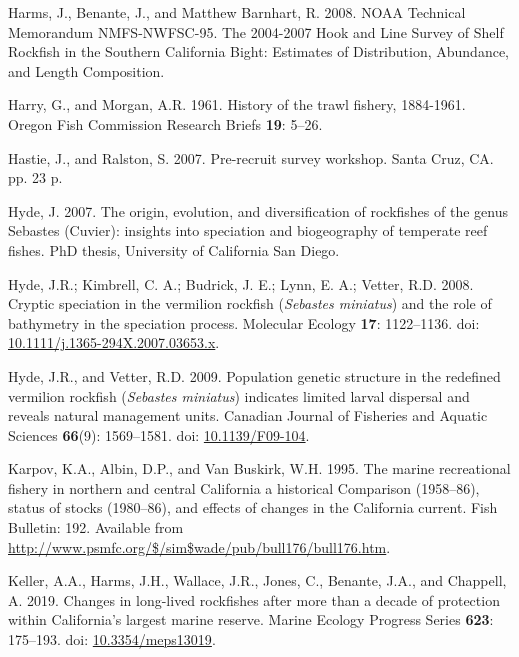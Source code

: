 \documentclass[11pt,
  english,
  a4paper,
]{article}
\newlength{\cslhangindent}
\newenvironment{CSLReferences}[2] %
 {%
  \setlength{\parindent}{0pt}
  \ifodd #1 \everypar{\setlength{\hangindent}{\cslhangindent}}\ignorespaces\fi
  \ifnum #2 > 0
  \setlength{\parskip}{#2\baselineskip}
  \fi
 }%
 {}
\begin{document}
\begin{CSLReferences}{1}{0}
\leavevmode{}%
Harms, J., Benante, J., and Matthew Barnhart, R. 2008. {NOAA Technical Memorandum NMFS-NWFSC-95. The 2004-2007 Hook and Line Survey of Shelf Rockfish in the Southern California Bight: Estimates of Distribution, Abundance, and Length Composition}.

\leavevmode{}%
Harry, G., and Morgan, A.R. 1961. {History of the trawl fishery, 1884-1961}. Oregon Fish Commission Research Briefs \textbf{19}: 5--26.

\leavevmode{}%
Hastie, J., and Ralston, S. 2007. {Pre-recruit survey workshop}. Santa Cruz, CA. pp. 23 p.

\leavevmode{}%
Hyde, J. 2007. {The origin, evolution, and diversification of rockfishes of the genus Sebastes (Cuvier): insights into speciation and biogeography of temperate reef fishes}. PhD thesis, University of California San Diego.

\leavevmode{}%
Hyde, J.R.; Kimbrell, C. A.; Budrick, J. E.; Lynn, E. A.; Vetter, R.D. 2008. {Cryptic speciation in the vermilion rockfish (\emph{Sebastes miniatus}) and the role of bathymetry in the speciation process}. Molecular Ecology \textbf{17}: 1122--1136. doi: \href{https://doi.org/10.1111/j.1365-294X.2007.03653.x}{10.1111/j.1365-294X.2007.03653.x}.

\leavevmode{}%
Hyde, J.R., and Vetter, R.D. 2009. {Population genetic structure in the redefined vermilion rockfish (\emph{Sebastes miniatus}) indicates limited larval dispersal and reveals natural management units}. Canadian Journal of Fisheries and Aquatic Sciences \textbf{66}(9): 1569--1581. doi: \href{https://doi.org/10.1139/F09-104}{10.1139/F09-104}.

\leavevmode{}%
Karpov, K.A., Albin, D.P., and Van Buskirk, W.H. 1995. {The marine recreational fishery in northern and central California a historical Comparison (1958--86), status of stocks (1980--86), and effects of changes in the California current}. Fish Bulletin: 192. Available from \url{http://www.psmfc.org/$/sim$wade/pub/bull176/bull176.htm}.

\leavevmode{}%
Keller, A.A., Harms, J.H., Wallace, J.R., Jones, C., Benante, J.A., and Chappell, A. 2019. {Changes in long-lived rockfishes after more than a decade of protection within California's largest marine reserve}. Marine Ecology Progress Series \textbf{623}: 175--193. doi: \href{https://doi.org/10.3354/meps13019}{10.3354/meps13019}.


\end{CSLReferences}
\end{document}

